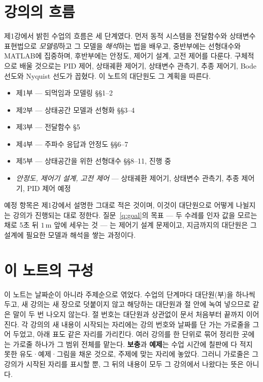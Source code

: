\documentclass[11pt]{article}
\begin{document}
\makelecheader

\section*{강의의 흐름}

제1강에서 밝힌 수업의 흐름은 세 단계였다. 먼저 동적 시스템을 전달함수와 상태변수
표현법으로 \emph{모델링}하고 그 모델을 \emph{해석}하는 법을 배우고, 중반부에는
선형대수와 MATLAB에 집중하며, 후반부에는 안정도, 제어기 설계, 고전 제어를 다룬다.
구체적으로 배울 것으로는 PID 제어, 상태궤환 제어기, 상태변수 관측기, 추종 제어기,
Bode 선도와 Nyquist 선도가 꼽혔다. 이 노트의 대단원도 그 계획을 따른다.

\begin{itemize}[leftmargin=1.2em,itemsep=1pt,topsep=3pt]
  \item 제1부 --- 되먹임과 모델링 \hfill {\small\S\S1--2}
  \item 제2부 --- 상태공간 모델과 선형화 \hfill {\small\S\S3--4}
  \item 제3부 --- 전달함수 \hfill {\small\S5}
  \item 제4부 --- 주파수 응답과 안정도 \hfill {\small\S\S6--7}
  \item 제5부 --- 상태공간을 위한 선형대수 \hfill {\small\S\S8--11, 진행 중}
  \item \emph{안정도, 제어기 설계, 고전 제어} --- 상태궤환 제어기, 상태변수 관측기,
        추종 제어기, PID 제어 \hfill {\small 예정}
\end{itemize}

예정 항목은 제1강에서 설명한 그대로 적은 것이며, 이것이 대단원으로 어떻게 나뉠지는
강의가 진행되는 대로 정한다. 질문~\ref{q:goal}의 목표 --- 두 수레를 인자 값을 모르는
채로 5초 뒤 $1$\,m 앞에 세우는 것 --- 는 제어기 설계 문제이고, 지금까지의 대단원은
그 설계에 필요한 모델과 해석을 쌓는 과정이다.

\section*{이 노트의 구성}

이 노트는 날짜순이 아니라 주제순으로 엮었다. 수업의 단계마다 대단원(부)을 하나씩
두고, 새 강의는 새 장으로 덧붙이지 않고 해당하는 대단원과 절 안에 녹여 넣으므로 같은
말이 두 번 나오지 않는다. 절 번호는 대단원과 상관없이 문서 처음부터 끝까지 이어진다.
각 강의의 새 내용이 시작되는 자리에는 강의 번호와 날짜를 단 가는 가로줄을 그어 두었고,
아래 표도 같은 자리를 가리킨다. 여러 강의를 한 단위로 묶어 정리한 곳에는 가로줄
하나가 그 범위 전체를 맡는다. \textbf{보충}과 \textbf{예제}는 수업 시간에 칠판에 다
적지 못한 유도·예제·그림을 채운 것으로, 주제에 맞는 자리에 놓았다. 그러니 가로줄은
그 강의가 시작된 자리를 표시할 뿐, 그 뒤의 내용이 모두 그 강의에서 나왔다는 뜻은
아니다.
\end{document}
